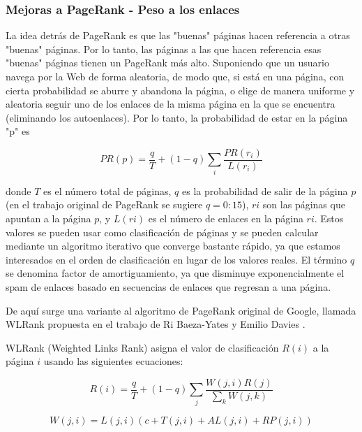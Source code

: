 \subsubsection{Mejoras a PageRank - Peso a los enlaces}

La idea detrás de PageRank es que las "buenas" páginas hacen referencia a otras "buenas" páginas. Por lo tanto, las páginas a las que hacen referencia esas "buenas" páginas tienen un PageRank más alto. Suponiendo que un usuario navega por la Web de forma aleatoria, de modo que, si está en una página, con cierta probabilidad se aburre y abandona la página, o elige de manera uniforme y aleatoria seguir uno de los enlaces de la misma página en la que se encuentra (eliminando los autoenlaces). Por lo tanto, la probabilidad de estar en la página "p" es

\begin{equation} 
	\label{eqn:ecuacionWLRank1} 
	PR(p) = \frac{q}{T} + (1 - q) \sum_{i} \frac{PR(r_i)}{L(r_i)} 
\end{equation}

donde $T$ es el número total de páginas, $q$ es la probabilidad de salir de la página $p$ (en el trabajo original de PageRank se sugiere $q = 0:15$), $ri$ son las páginas que apuntan a la página $p$, y $L(ri)$ es el número de enlaces en la página $ri$. Estos valores se pueden usar como clasificación de páginas y se pueden calcular mediante un algoritmo iterativo que converge bastante rápido, ya que estamos interesados en el orden de clasificación en lugar de los valores reales. El término $q$ se denomina factor de amortiguamiento, ya que disminuye exponencialmente el spam de enlaces basado en secuencias de enlaces que regresan a una página.

De aquí surge una variante al algoritmo de PageRank original de Google, llamada WLRank propuesta en el trabajo de Ri Baeza-Yates y Emilio Davies \cite{baeza2004web}.

WLRank (Weighted Links Rank) asigna el valor de clasificación $R(i)$ a la página $i$ usando las siguientes ecuaciones:

\begin{equation} 
	\label{eqn:ecuacionWLRank2} 
	R(i) = \frac{q}{T} + (1 - q) \sum_{j} \frac{W(j,i)R(j)}{\sum_{k}W(j,k)} 
\end{equation}

\begin{equation} 
	\label{eqn:ecuacionWLRank3} 
	W(j,i) = L(j,i)(c+T(j,i)+AL(j,i)+RP(j,i))
\end{equation}


